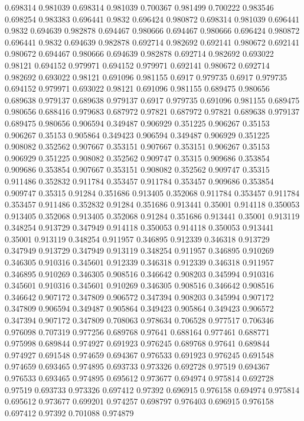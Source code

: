 0.698314 0.981039
0.698314 0.981039
0.700367 0.981499
0.700222 0.983546
0.698254 0.983383
0.696441 0.9832
0.696424 0.980872
0.698314 0.981039
0.696441 0.9832
0.694639 0.982878
0.694467 0.980666
0.694467 0.980666
0.696424 0.980872
0.696441 0.9832
0.694639 0.982878
0.692714 0.982692
0.692141 0.980672
0.692141 0.980672
0.694467 0.980666
0.694639 0.982878
0.692714 0.982692
0.693022 0.98121
0.694152 0.979971
0.694152 0.979971
0.692141 0.980672
0.692714 0.982692
0.693022 0.98121
0.691096 0.981155
0.6917 0.979735
0.6917 0.979735
0.694152 0.979971
0.693022 0.98121
0.691096 0.981155
0.689475 0.980656
0.689638 0.979137
0.689638 0.979137
0.6917 0.979735
0.691096 0.981155
0.689475 0.980656
0.688416 0.979683
0.687972 0.97821
0.687972 0.97821
0.689638 0.979137
0.689475 0.980656
0.906594 0.349487
0.906929 0.351225
0.906267 0.35153
0.906267 0.35153
0.905864 0.349423
0.906594 0.349487
0.906929 0.351225
0.908082 0.352562
0.907667 0.353151
0.907667 0.353151
0.906267 0.35153
0.906929 0.351225
0.908082 0.352562
0.909747 0.35315
0.909686 0.353854
0.909686 0.353854
0.907667 0.353151
0.908082 0.352562
0.909747 0.35315
0.911486 0.352832
0.911784 0.353457
0.911784 0.353457
0.909686 0.353854
0.909747 0.35315
0.91284 0.351686
0.913405 0.352068
0.911784 0.353457
0.911784 0.353457
0.911486 0.352832
0.91284 0.351686
0.913441 0.35001
0.914118 0.350053
0.913405 0.352068
0.913405 0.352068
0.91284 0.351686
0.913441 0.35001
0.913119 0.348254
0.913729 0.347949
0.914118 0.350053
0.914118 0.350053
0.913441 0.35001
0.913119 0.348254
0.911957 0.346895
0.912339 0.346318
0.913729 0.347949
0.913729 0.347949
0.913119 0.348254
0.911957 0.346895
0.910269 0.346305
0.910316 0.345601
0.912339 0.346318
0.912339 0.346318
0.911957 0.346895
0.910269 0.346305
0.908516 0.346642
0.908203 0.345994
0.910316 0.345601
0.910316 0.345601
0.910269 0.346305
0.908516 0.346642
0.908516 0.346642
0.907172 0.347809
0.906572 0.347394
0.908203 0.345994
0.907172 0.347809
0.906594 0.349487
0.905864 0.349423
0.905864 0.349423
0.906572 0.347394
0.907172 0.347809
0.708063 0.978634
0.706528 0.977517
0.706346 0.976098
0.707319 0.977256
0.689768 0.97641
0.688164 0.977461
0.688771 0.975998
0.689844 0.974927
0.691923 0.976245
0.689768 0.97641
0.689844 0.974927
0.691548 0.974659
0.694367 0.976533
0.691923 0.976245
0.691548 0.974659
0.693465 0.974895
0.693733 0.973326
0.692728 0.97519
0.694367 0.976533
0.693465 0.974895
0.695612 0.973677
0.694974 0.975814
0.692728 0.97519
0.693733 0.973326
0.697412 0.97392
0.696915 0.976158
0.694974 0.975814
0.695612 0.973677
0.699201 0.974257
0.698797 0.976403
0.696915 0.976158
0.697412 0.97392
0.701088 0.974879
